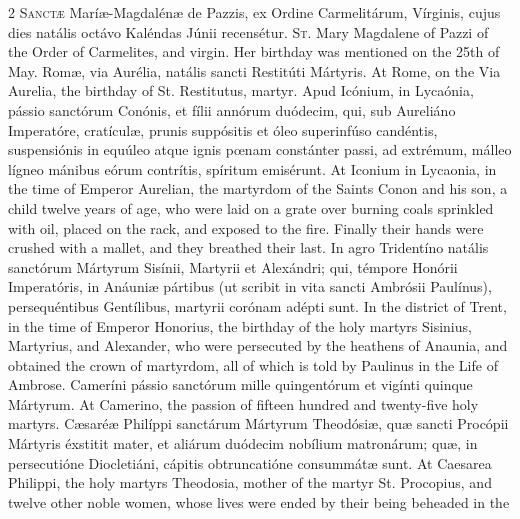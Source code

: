 \begin{paracol}{2}
\lettrine[lines=2]{S}{anctæ} Maríæ-Magdalénæ 
 de Pazzis, ex Ordine Carmelitárum, Vírginis, cujus dies natális octávo 
 Kaléndas Júnii recensétur.
\switchcolumn
{}
\lettrine[lines=2]{S}{t.} Mary Magdalene of Pazzi of the 
 Order of Carmelites, and virgin. Her birthday was mentioned on the 
 25th of May.
\switchcolumn*
{}
Romæ, via Aurélia, natális sancti Restitúti Mártyris.
\switchcolumn
{}
At Rome, on the Via Aurelia, the 
 birthday of St. Restitutus, martyr.
\switchcolumn*
{}
Apud Icónium, in 
 Lycaónia, pássio sanctórum Conónis, et fílii annórum duódecim, qui, sub 
 Aureliáno Imperatóre, cratículæ, prunis suppósitis et óleo superinfúso 
 candéntis, suspensiónis in equúleo atque ignis pœnam constánter passi, ad 
 extrémum, málleo lígneo mánibus eórum contrítis, spíritum emisérunt.
\switchcolumn
{}
At Iconium in Lycaonia, in the time 
 of Emperor Aurelian, the martyrdom of the Saints Conon and his son, a child 
 twelve years of age, who were laid on a grate over burning coals sprinkled 
 with oil, placed on the rack, and exposed to the fire. Finally their 
 hands were crushed with a mallet, and they breathed their last.
\switchcolumn*
{}
In agro Tridentíno 
 natális sanctórum Mártyrum Sisínii, Martyrii et Alexándri; qui, témpore 
 Honórii Imperatóris, in Anáuniæ pártibus (ut scribit in vita sancti Ambrósii 
 Paulínus), persequéntibus Gentílibus, martyrii corónam adépti sunt.
\switchcolumn
{}
In the district of Trent, in the 
 time of Emperor Honorius, the birthday of the holy martyrs Sisinius, 
 Martyrius, and Alexander, who were persecuted by the heathens of Anaunia, 
 and obtained the crown of martyrdom, all of which is told by Paulinus in the
 Life of Ambrose.
\switchcolumn*
{}
Cameríni pássio 
 sanctórum mille quingentórum et vigínti quinque Mártyrum.
\switchcolumn
{}
At Camerino, the passion of fifteen 
 hundred and twenty-five holy martyrs.
\switchcolumn*
{}
Cæsaréæ Philíppi 
 sanctárum Mártyrum Theodósiæ, quæ sancti Procópii Mártyris 
 éxstitit mater, 
 et aliárum duódecim nobílium matronárum; quæ, in persecutióne Diocletiáni, 
 cápitis obtruncatióne consummátæ sunt.
\switchcolumn
{}
At Caesarea Philippi, the holy 
 martyrs Theodosia, mother of the martyr St. Procopius, and twelve other 
 noble women, whose lives were ended by their being beheaded in the 

\end{paracol}
